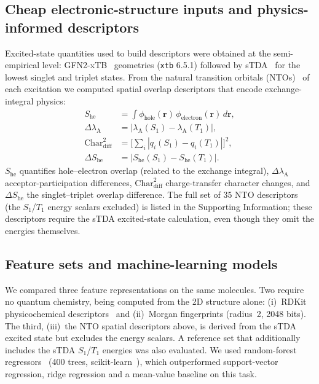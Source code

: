 \subsection{Cheap electronic-structure inputs and physics-informed descriptors}

Excited-state quantities used to build descriptors were obtained at the
semi-empirical level: GFN2-xTB~\cite{Bannwarth2019} geometries
(\texttt{xtb} 6.5.1) followed by sTDA~\cite{Grimme2017} for the lowest singlet
and triplet states. From the natural transition orbitals
(NTOs)~\cite{Martin2003} of each excitation we computed spatial overlap
descriptors that encode exchange-integral physics:
\begin{align}
  S_\text{he} &= \int \phi_\text{hole}(\mathbf{r})\,\phi_\text{electron}(\mathbf{r})\,d\mathbf{r}, \label{eq:overlap}\\
  \Delta\lambda_\text{A} &= |\lambda_\text{A}(S_1) - \lambda_\text{A}(T_1)|, \label{eq:delta_lambda}\\
  \text{Char}_\text{diff}^2 &= \Big[\textstyle\sum_i |q_i(S_1) - q_i(T_1)|\Big]^2, \label{eq:char_diff}\\
  \Delta S_\text{he} &= |S_\text{he}(S_1) - S_\text{he}(T_1)|. \label{eq:delta_overlap}
\end{align}
$S_\text{he}$ quantifies hole--electron overlap (related to the exchange
integral), $\Delta\lambda_\text{A}$ acceptor-participation differences,
$\text{Char}_\text{diff}^2$ charge-transfer character changes, and
$\Delta S_\text{he}$ the singlet--triplet overlap difference. The full set of
\num{35} NTO descriptors (the $S_1$/$T_1$ energy scalars excluded) is listed in
the Supporting Information; these descriptors require the sTDA excited-state
calculation, even though they omit the energies themselves.

\subsection{Feature sets and machine-learning models}

We compared three feature representations on the same molecules. Two require no
quantum chemistry, being computed from the 2D structure alone:
(i)~RDKit physicochemical descriptors~\cite{Landrum2016} and (ii)~Morgan
fingerprints (radius~2, \num{2048} bits). The third, (iii)~the NTO spatial
descriptors above, is derived from the sTDA excited state but excludes the energy
scalars. A reference set that additionally includes the sTDA $S_1$/$T_1$
energies was also evaluated. We used random-forest
regressors~\cite{Breiman2001} (\num{400} trees, scikit-learn~\cite{Pedregosa2011}),
which outperformed support-vector regression, ridge regression and a mean-value
baseline on this task.

